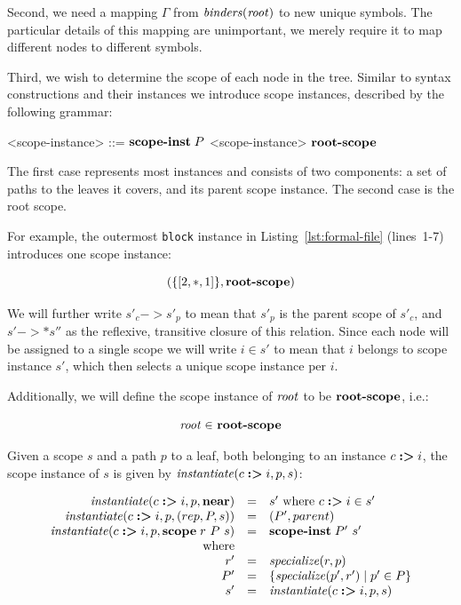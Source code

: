 \documentclass{kththesis}
\begin{document}
Second, we need a mapping $\Gamma$ from $\mathit{binders}(\mathit{root})$ to new unique symbols. The particular details of this mapping are unimportant, we merely require it to map different nodes to different symbols.

Third, we wish to determine the scope of each node in the tree. Similar to syntax constructions and their instances we introduce scope instances, described by the following grammar:

\newcommand{\rootscope}{\ensuremath{\mathrel{\text{\textbf{root-scope}}}}}
\newcommand{\scopeinst}{\mathrel{\text{\textbf{scope-inst}}}}

\begin{grammar}
<scope-instance> ::= $\scopeinst P$ <scope-instance>
  \alt \rootscope
\end{grammar}

The first case represents most instances and consists of two components: a set of paths to the leaves it covers, and its parent scope instance. The second case is the root scope.

For example, the outermost \texttt{block} instance in Listing~\ref{lst:formal-file} (lines~1-7) introduces one scope instance:

$$
(\{[2, *, 1]\}, \rootscope)
$$

We will further write $s'_c -> s'_p$ to mean that $s'_p$ is the parent scope of $s'_c$, and $s' ->* s''$ as the reflexive, transitive closure of this relation. Since each node will be assigned to a single scope we will write $i \in s'$ to mean that $i$ belongs to scope instance $s'$, which then selects a unique scope instance per $i$.

Additionally, we will define the scope instance of $\mathit{root}$ to be $\rootscope$, i.e.:

$$ \rooti \in\ \rootscope $$

\newcommand{\instantiate}{\ensuremath{\mathit{instantiate}}}

Given a scope $s$ and a path $p$ to a leaf, both belonging to an instance $c \mathrel{\textbf{:>}} i$, the scope instance of $s$ is given by $\instantiate(c \tagged i, p, s)$:

$$
\begin{array}{rcl}
\instantiate(c \tagged i, p, \near) & = & s' \text{ where } c \tagged i \in s' \\
\instantiate(c \tagged i, p, \text{(}rep, P, s\text{)}) & = & \text{(}P', parent\text{)} \\
\instantiate(c \tagged i, p, \scope r\ P\ s) & = & \scopeinst P'\ s' \\
\text{where} & & \\
r' & = & \specialize(r, p) \\
P' & = & \{\specialize(p', r') \mid p' \in P\} \\
s' & = & \instantiate(c \tagged i, p, s) \\
\end{array}
$$
\end{document}
